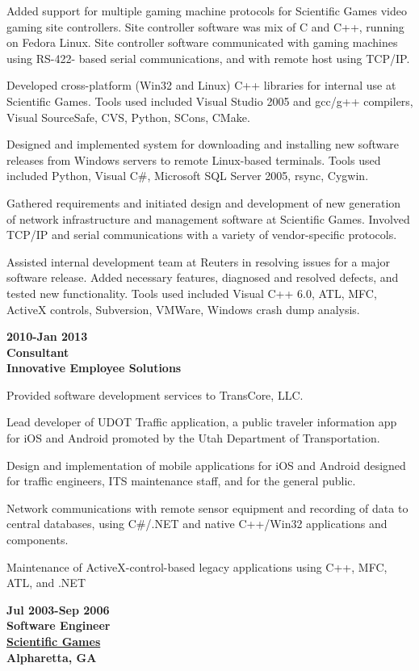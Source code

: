 Added support for multiple gaming machine protocols for Scientific Games
video gaming site controllers. Site controller software was mix of C and
C++, running on Fedora Linux. Site controller software communicated with
gaming machines using RS-422- based serial communications, and with
remote host using TCP/IP.

Developed cross-platform (Win32 and Linux) C++ libraries for internal
use at Scientific Games. Tools used included Visual Studio 2005 and
gcc/g++ compilers, Visual SourceSafe, CVS, Python, SCons, CMake.

Designed and implemented system for downloading and installing new
software releases from Windows servers to remote Linux-based terminals.
Tools used included Python, Visual C\#, Microsoft SQL Server 2005,
rsync, Cygwin.

Gathered requirements and initiated design and development of new
generation of network infrastructure and management software at
Scientific Games. Involved TCP/IP and serial communications with a
variety of vendor-specific protocols.

Assisted internal development team at Reuters in resolving issues for a
major software release. Added necessary features, diagnosed and resolved
defects, and tested new functionality. Tools used included Visual C++
6.0, ATL, MFC, ActiveX controls, Subversion, VMWare, Windows crash dump
analysis.

\textbf{2010-Jan 2013\\
Consultant\\
Innovative Employee Solutions}

Provided software development services to TransCore, LLC.

Lead developer of UDOT Traffic application, a public traveler
information app for iOS and Android promoted by the Utah Department of
Transportation.

Design and implementation of mobile applications for iOS and Android
designed for traffic engineers, ITS maintenance staff, and for the
general public.

Network communications with remote sensor equipment and recording of
data to central databases, using C\#/.NET and native C++/Win32
applications and components.

Maintenance of ActiveX-control-based legacy applications using C++, MFC,
ATL, and .NET

\textbf{Jul 2003-Sep 2006\\
Software Engineer\\
\href{https://www.scientificgames.com}{Scientific Games}\\
Alpharetta, GA}

